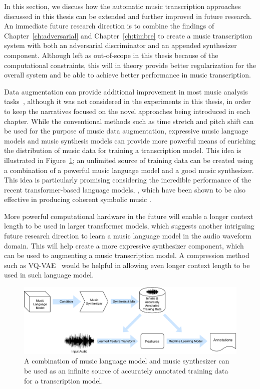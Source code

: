 In this section, we discuss how the automatic music transcription approaches discussed in this thesis can be extended and further improved in future research.
An immediate future research direction is to combine the findings of Chapter~\ref{ch:adversarial} and Chapter~\ref{ch:timbre} to create a music transcription system with both an adversarial discriminator and an appended synthesizer component.
Although left as out-of-scope in this thesis because of the computational constraints, this will in theory provide better regularization for the overall system and be able to achieve better performance in music transcription.

Data augmentation can provide additional improvement in most music analysis tasks~\cite{mcfee2015muda}, although it was not considered in the experiments in this thesis, in order to keep the narratives focused on the novel approaches being introduced in each chapter.
While the conventional methods such as time stretch and pitch shift can be used for the purpose of music data augmentation, expressive music language models and music synthesis models can provide more powerful means of enriching the distribution of music data for training a transcription model.
This idea is illustrated in Figure~\ref{fig:unlimited-data}; an unlimited source of training data can be created using a combination of a powerful music language model and a good music synthesizer.
This idea is particularly promising considering the incredible performance of the recent transformer-based language models, 
, which have been shown to be also effective in producing coherent symbolic music \cite{huang2019transformer}.

More powerful computational hardware in the future will enable a longer context length to be used in larger transformer models, which suggests another intriguing future research direction to learn a music language model in the audio waveform domain.
This will help create a more expressive synthesizer component, which can be used to augmenting a music transcription model.
A compression method such as VQ-VAE~\cite{oord2017vqvae} would be helpful in allowing even longer context length to be used in such language model.


\begin{figure}
\centering
\includegraphics[width=\textwidth]{paradigms-5-proposed.pdf}
\caption{A combination of music language model and music synthesizer can be used as an infinite source of accurately annotated training data for a transcription model.}\label{fig:unlimited-data}
\end{figure}


